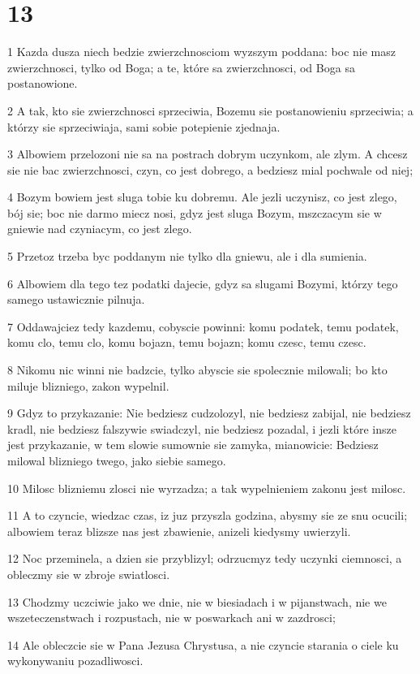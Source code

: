 \chapter{13}

\par 1 Kazda dusza niech bedzie zwierzchnosciom wyzszym poddana: boc nie masz zwierzchnosci, tylko od Boga; a te, które sa zwierzchnosci, od Boga sa postanowione.
\par 2 A tak, kto sie zwierzchnosci sprzeciwia, Bozemu sie postanowieniu sprzeciwia; a którzy sie sprzeciwiaja, sami sobie potepienie zjednaja.
\par 3 Albowiem przelozoni nie sa na postrach dobrym uczynkom, ale zlym. A chcesz sie nie bac zwierzchnosci, czyn, co jest dobrego, a bedziesz mial pochwale od niej;
\par 4 Bozym bowiem jest sluga tobie ku dobremu. Ale jezli uczynisz, co jest zlego, bój sie; boc nie darmo miecz nosi, gdyz jest sluga Bozym, mszczacym sie w gniewie nad czyniacym, co jest zlego.
\par 5 Przetoz trzeba byc poddanym nie tylko dla gniewu, ale i dla sumienia.
\par 6 Albowiem dla tego tez podatki dajecie, gdyz sa slugami Bozymi, którzy tego samego ustawicznie pilnuja.
\par 7 Oddawajciez tedy kazdemu, cobyscie powinni: komu podatek, temu podatek, komu clo, temu clo, komu bojazn, temu bojazn; komu czesc, temu czesc.
\par 8 Nikomu nic winni nie badzcie, tylko abyscie sie spolecznie milowali; bo kto miluje blizniego, zakon wypelnil.
\par 9 Gdyz to przykazanie: Nie bedziesz cudzolozyl, nie bedziesz zabijal, nie bedziesz kradl, nie bedziesz falszywie swiadczyl, nie bedziesz pozadal, i jezli które insze jest przykazanie, w tem slowie sumownie sie zamyka, mianowicie: Bedziesz milowal blizniego twego, jako siebie samego.
\par 10 Milosc blizniemu zlosci nie wyrzadza; a tak wypelnieniem zakonu jest milosc.
\par 11 A to czyncie, wiedzac czas, iz juz przyszla godzina, abysmy sie ze snu ocucili; albowiem teraz blizsze nas jest zbawienie, anizeli kiedysmy uwierzyli.
\par 12 Noc przeminela, a dzien sie przyblizyl; odrzucmyz tedy uczynki ciemnosci, a obleczmy sie w zbroje swiatlosci.
\par 13 Chodzmy uczciwie jako we dnie, nie w biesiadach i w pijanstwach, nie we wszeteczenstwach i rozpustach, nie w poswarkach ani w zazdrosci;
\par 14 Ale obleczcie sie w Pana Jezusa Chrystusa, a nie czyncie starania o ciele ku wykonywaniu pozadliwosci.

